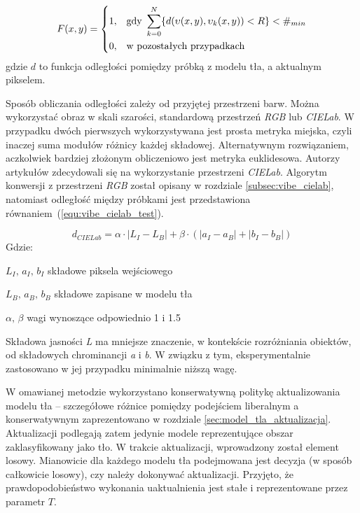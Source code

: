 	\begin{equation}
	    F(x,y) = 
		\begin{dcases}
    		1, & \text{gdy } \sum_{k=0}^{N} \{ d(\upsilon(x,y), \upsilon_k(x,y)) < R \} < \#_{min} \\
    		0, & \text{w pozostałych przypadkach} 
		\end{dcases}
	\label{equ:vibe_test}	
	\end{equation}
\noindent gdzie $d$ to funkcja odległości pomiędzy próbką z modelu tła, a aktualnym pikselem.

Sposób obliczania odległości zależy od przyjętej przestrzeni barw. 
Można wykorzystać obraz w skali szarości, standardową przestrzeń \textit{RGB} lub \textit{CIELab}. 
W przypadku dwóch pierwszych wykorzystywana jest prosta metryka miejska, czyli inaczej suma modułów różnicy każdej składowej. 
Alternatywnym rozwiązaniem, aczkolwiek bardziej złożonym obliczeniowo jest metryka euklidesowa. 
Autorzy artykułów \cite{kryjak_14_vibe, kryjak_13_vibe} zdecydowali się na wykorzystanie przestrzeni \textit{CIELab}. Algorytm konwersji z przestrzeni \textit{RGB} został opisany w rozdziale \ref{subsec:vibe_cielab}, natomiast odległość między próbkami jest przedstawiona równaniem~(\ref{equ:vibe_cielab_test}).

	\begin{equation}
	    d_{CIELab} = \alpha \cdot |L_I - L_B| + \beta \cdot (| a_I - a_B | + | b_I - b_B |)
	\label{equ:vibe_cielab_test}
	\end{equation}
Gdzie:
\begin{eqwhere}[2.6cm]
	\item[$L_I,\, a_I,\, b_I$] składowe piksela wejściowego
	\item[$L_B,\, a_B,\, b_B$] składowe zapisane w modelu tła
	\item[$\alpha,\, \beta$] wagi wynoszące odpowiednio \num{1} i \num{1.5}
\end{eqwhere}

\noindent Składowa jasności \textit{L} ma mniejsze znaczenie, w kontekście rozróżniania obiektów, od składowych chrominancji \textit{a} i \textit{b}. W związku z tym, eksperymentalnie zastosowano w jej przypadku minimalnie niższą wagę.  

W omawianej metodzie wykorzystano konserwatywną politykę aktualizowania modelu tła -- szczegółowe różnice pomiędzy podejściem liberalnym a konserwatywnym zaprezentowano w rozdziale \ref{sec:model_tla_aktualizacja}. 
Aktualizacji podlegają zatem jedynie modele reprezentujące obszar zaklasyfikowany jako tło.
W trakcie aktualizacji, wprowadzony został element losowy. Mianowicie dla każdego modelu tła podejmowana jest decyzja (w sposób całkowicie losowy), czy należy dokonywać aktualizacji. 
Przyjęto, że prawdopodobieństwo wykonania uaktualnienia jest stałe i reprezentowane przez parametr $T$. 

